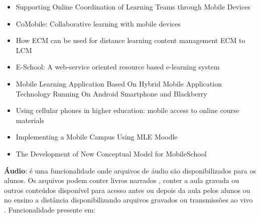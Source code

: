 \vspace{-5mm}
\begin{itemize}
    \item Supporting Online Coordination of Learning Teams through Mobile Devices \cite{roig-torres_supporting_2012}
    \item CoMobile: Collaborative learning with mobile devices \cite{nguyen_comobile:_2006}
    \item How ECM can be used for distance learning content management ECM to LCM \cite{daoudi_how_2012}
    \item E-School: A web-service oriented resource based e-learning system \cite{sultana_e-school:_2010}
    \item Mobile Learning Application Based On Hybrid Mobile Application Technology Running On Android Smartphone and Blackberry \cite{setiabudi_mobile_2013}
    \item Using cellular phones in higher education: mobile access to online course materials \cite{mermelstein_using_2005}
    \item Implementing a Mobile Campus Using MLE Moodle \cite{xhafa_implementing_2010}
    \item The Development of New Conceptual Model for MobileSchool \cite{hashim_development_2012}
\end{itemize}

\textbf{Áudio}: é uma funcionalidade onde arquivos de áudio são disponibilizados para os alunos. Os arquivos podem conter livros narrados \cite{mermelstein_using_2005}, conter a aula gravada ou outros conteúdos disponível para acesso antes ou depois da aula pelos alunos \cite{boyinbode_mobile_2012} ou no ensino a distância disponibilizando arquivos gravados ou transmissões ao vivo \cite{hoganson_distance-learning_2009, rodriguez-alsina_unified_2010}.  Funcionalidade presente em: 

